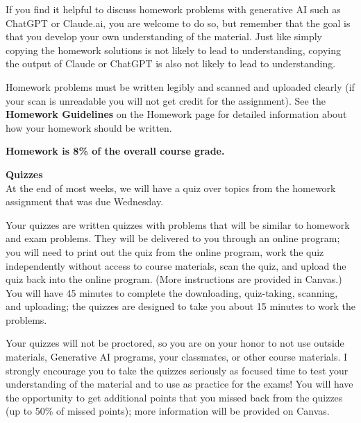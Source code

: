 \documentclass[11pt]{article}
\renewcommand{\emph}[1]{\textsf{\textbf{#1}}}
\newcommand{\localhead}[1]{\par\smallskip\textbf{#1} \smallskip\nobreak\\}%
\def\heading#1{\localhead{\large\emph{#1}}}
\begin{document}
If you find it helpful to discuss homework problems with generative AI such as ChatGPT or Claude.ai, you are welcome to do so, but remember that the goal is that you develop your own understanding of the material. Just like simply copying the homework solutions is not likely to lead to understanding, copying the output of Claude or ChatGPT is also not likely to lead to understanding.

Homework problems must be written legibly and scanned and uploaded clearly (if your scan is unreadable you will not get credit for the assignment). See the \emph{Homework Guidelines} on the Homework page for detailed information about how your homework should be written.  


\emph{Homework is 8\% of the overall course
grade.}

\heading{Quizzes}
At the end of most weeks, we will have a quiz over topics from the homework assignment that was due Wednesday. %

Your quizzes are written quizzes with problems that will be similar to homework and exam problems.  They will be delivered to you through an online program; you will need to print out the quiz from the online program, work the quiz independently without access to course materials, scan the quiz, and upload the quiz back into the online program. (More instructions are provided in Canvas.) You will have 45 minutes to complete the downloading, quiz-taking, scanning, and uploading; the quizzes are designed to take you about 15 minutes to work the problems.

Your quizzes will not be proctored, so you are on your honor to not use outside materials, Generative AI programs, your classmates, or other course materials. I strongly encourage you to take the quizzes seriously as focused time to test your understanding of the material and to use as practice for the exams! You will have the opportunity to get additional points that you missed back from the quizzes (up to 50\% of missed points); more information will be provided on Canvas.
\end{document}

